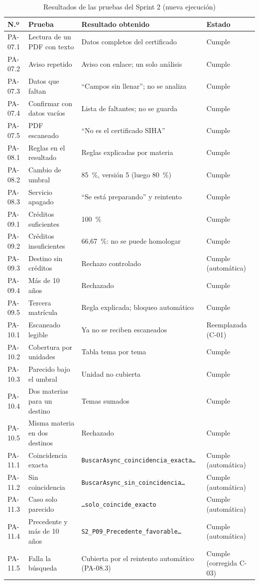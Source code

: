 \begin{table}[H]\centering\small
\begin{tabularx}{\textwidth}{|l|X|X|l|}\hline
\rowcolor{grisTarjeta}\textbf{N.º} & \textbf{Prueba} & \textbf{Resultado obtenido} & \textbf{Estado}\\\hline
PA-07.1 & Lectura de un PDF con texto & Datos completos del certificado & Cumple\\\hline
PA-07.2 & Aviso repetido & Aviso con enlace; un solo análisis & Cumple\\\hline
PA-07.3 & Datos que faltan & ``Campos sin llenar''; no se analiza & Cumple\\\hline
PA-07.4 & Confirmar con datos vacíos & Lista de faltantes; no se guarda & Cumple\\\hline
PA-07.5 & PDF escaneado & ``No es el certificado SIHA'' & Cumple\\\hline
PA-08.1 & Reglas en el resultado & Reglas explicadas por materia & Cumple\\\hline
PA-08.2 & Cambio de umbral & 85~\%, versión 5 (luego 80~\%) & Cumple\\\hline
PA-08.3 & Servicio apagado & ``Se está preparando'' y reintento & Cumple\\\hline
PA-09.1 & Créditos suficientes & 100~\% & Cumple\\\hline
PA-09.2 & Créditos insuficientes & 66,67~\%: no se puede homologar & Cumple\\\hline
PA-09.3 & Destino sin créditos & Rechazo controlado & Cumple (automática)\\\hline
PA-09.4 & Más de 10 años & Rechazado & Cumple\\\hline
PA-09.5 & Tercera matrícula & Regla explicada; bloqueo automático & Cumple\\\hline
PA-10.1 & Escaneado legible & Ya no se reciben escaneados & Reemplazada (C-01)\\\hline
PA-10.2 & Cobertura por unidades & Tabla tema por tema & Cumple\\\hline
PA-10.3 & Parecido bajo el umbral & Unidad no cubierta & Cumple\\\hline
PA-10.4 & Dos materias para un destino & Temas sumados & Cumple\\\hline
PA-10.5 & Misma materia en dos destinos & Rechazado & Cumple\\\hline
PA-11.1 & Coincidencia exacta & \texttt{BuscarAsync\_coincidencia\_exacta\dots} & Cumple (automática)\\\hline
PA-11.2 & Sin coincidencia & \texttt{BuscarAsync\_sin\_coincidencia\dots} & Cumple (automática)\\\hline
PA-11.3 & Caso solo parecido & \texttt{\dots solo\_coincide\_exacto} & Cumple (automática)\\\hline
PA-11.4 & Precedente y más de 10 años & \texttt{S2\_P09\_Precedente\_favorable\dots} & Cumple (automática)\\\hline
PA-11.5 & Falla la búsqueda & Cubierta por el reintento automático (PA-08.3) & Cumple (corregida C-03)\\\hline
\end{tabularx}
\caption{Resultados de las pruebas del Sprint 2 (nueva ejecución)}
\end{table}

